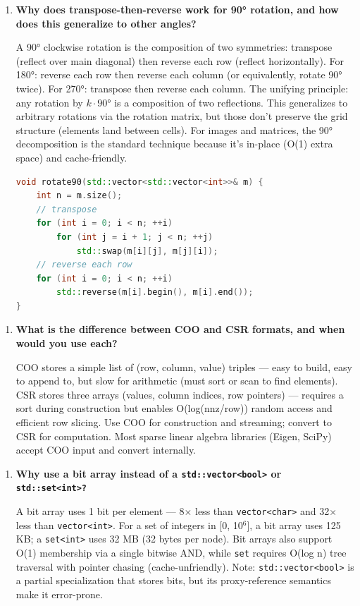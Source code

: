 \begin{enumerate}
\item \textbf{Why does transpose-then-reverse work for 90° rotation, and how does this generalize to other angles?}

A 90° clockwise rotation is the composition of two symmetries: transpose (reflect over main diagonal) then reverse each row (reflect horizontally). For 180°: reverse each row then reverse each column (or equivalently, rotate 90° twice). For 270°: transpose then reverse each column. The unifying principle: any rotation by $k \cdot 90°$ is a composition of two reflections. This generalizes to arbitrary rotations via the rotation matrix, but those don't preserve the grid structure (elements land between cells). For images and matrices, the 90° decomposition is the standard technique because it's in-place (O(1) extra space) and cache-friendly.

\begin{lstlisting}[language=C++]
void rotate90(std::vector<std::vector<int>>& m) {
    int n = m.size();
    // transpose
    for (int i = 0; i < n; ++i)
        for (int j = i + 1; j < n; ++j)
            std::swap(m[i][j], m[j][i]);
    // reverse each row
    for (int i = 0; i < n; ++i)
        std::reverse(m[i].begin(), m[i].end());
}
\end{lstlisting}
\end{enumerate}

\begin{enumerate}
\item \textbf{What is the difference between COO and CSR formats, and when would you use each?}

COO stores a simple list of (row, column, value) triples — easy to build, easy to append to, but slow for arithmetic (must sort or scan to find elements). CSR stores three arrays (values, column indices, row pointers) — requires a sort during construction but enables O(log(nnz/row)) random access and efficient row slicing. Use COO for construction and streaming; convert to CSR for computation. Most sparse linear algebra libraries (Eigen, SciPy) accept COO input and convert internally.
\end{enumerate}

\begin{enumerate}
\item \textbf{Why use a bit array instead of a \texttt{std::vector<bool>} or \texttt{std::set<int>?}}

A bit array uses 1 bit per element — 8$\times$ less than \texttt{vector<char>} and 32$\times$ less than \texttt{vector<int>}. For a set of integers in [0, 10$^{6}$], a bit array uses 125 KB; a \texttt{set<int>} uses 32 MB (32 bytes per node). Bit arrays also support O(1) membership via a single bitwise AND, while \texttt{set} requires O(log n) tree traversal with pointer chasing (cache-unfriendly). Note: \texttt{std::vector<bool>} is a partial specialization that stores bits, but its proxy-reference semantics make it error-prone.
\end{enumerate}

